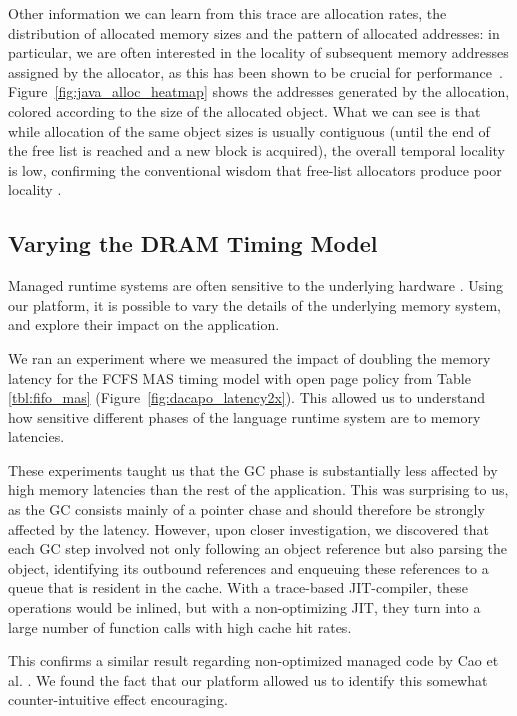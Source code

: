 Other information we can learn from this trace are allocation rates, the distribution of allocated memory sizes and the pattern of allocated addresses: in particular, we are often interested in the locality of subsequent memory addresses assigned by the allocator, as this has been shown to be crucial for performance~\cite{Blackburn:2004:OWH:998675.999420}. Figure~\ref{fig:java_alloc_heatmap} shows the addresses generated by the allocation, colored according to the size of the allocated object. What we can see is that while allocation of the same object sizes is usually contiguous (until the end of the free list is reached and a new block is acquired), the overall temporal locality is low, confirming the conventional wisdom that free-list allocators produce poor locality \cite{Blackburn:2004:OWH:998675.999420}.

\subsection{Varying the DRAM Timing Model}

Managed runtime systems are often sensitive to the underlying hardware \cite{Cao:2012:YYP:2337159.2337185}. Using our platform, it is possible to vary the details of the underlying memory system, and explore their impact on the application.

We ran an experiment where we measured the impact of doubling the memory latency for the FCFS MAS
timing model with open page policy from Table \ref{tbl:fifo_mas}
(Figure~\ref{fig:dacapo_latency2x}). This allowed us to understand how sensitive different phases
of the language runtime system are to memory latencies.

These experiments taught us that the GC phase is substantially less affected by high memory latencies than the rest of the application. This was surprising to us, as the GC consists mainly of a pointer chase and should therefore be strongly affected by the latency. However, upon closer investigation, we discovered that each GC step involved not only following an object reference but also parsing the object, identifying its outbound references and enqueuing these references to a queue that is resident in the cache. With a trace-based JIT-compiler, these operations would be inlined, but with a non-optimizing JIT, they turn into a large number of function calls with high cache hit rates.

This confirms a similar result regarding non-optimized managed code by Cao et al. \cite{Cao:2012:YYP:2337159.2337185}. We found the fact that our platform allowed us to identify this somewhat counter-intuitive effect encouraging.

